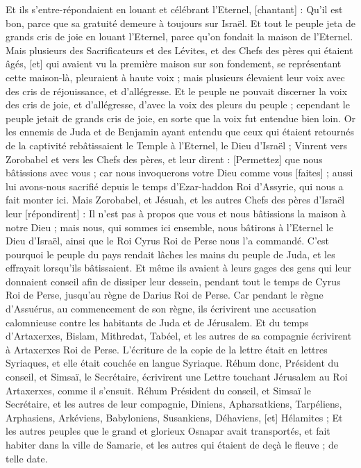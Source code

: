 \begin{multicols}{2}
Et ils s'entre-répondaient en louant et célébrant l'Eternel, [chantant] : Qu'il est bon, parce que sa gratuité demeure à toujours sur Israël. Et tout le peuple jeta de grands cris de joie en louant l'Eternel, parce qu'on fondait la maison de l'Eternel.
Mais plusieurs des Sacrificateurs et des Lévites, et des Chefs des pères qui étaient âgés, [et] qui avaient vu la première maison sur son fondement, se représentant cette maison-là, pleuraient à haute voix ; mais plusieurs élevaient leur voix avec des cris de réjouissance, et d'allégresse.
Et le peuple ne pouvait discerner la voix des cris de joie, et d'allégresse, d'avec la voix des pleurs du peuple ; cependant le peuple jetait de grands cris de joie, en sorte que la voix fut entendue bien loin.
\VerseOne{}Or les ennemis de Juda et de Benjamin ayant entendu que ceux qui étaient retournés de la captivité rebâtissaient le Temple à l'Eternel, le Dieu d'Israël ;
Vinrent vers Zorobabel et vers les Chefs des pères, et leur dirent : [Permettez] que nous bâtissions avec vous ; car nous invoquerons votre Dieu comme vous [faites] ; aussi lui avons-nous sacrifié depuis le temps d'Ezar-haddon Roi d'Assyrie, qui nous a fait monter ici.
Mais Zorobabel, et Jésuah, et les autres Chefs des pères d'Israël leur [répondirent] : Il n'est pas à propos que vous et nous bâtissions la maison à notre Dieu ; mais nous, qui sommes ici ensemble, nous bâtirons à l'Eternel le Dieu d'Israël, ainsi que le Roi Cyrus Roi de Perse nous l'a commandé.
C'est pourquoi le peuple du pays rendait lâches les mains du peuple de Juda, et les effrayait lorsqu'ils bâtissaient.
Et même ils avaient à leurs gages des gens qui leur donnaient conseil afin de dissiper leur dessein, pendant tout le temps de Cyrus Roi de Perse, jusqu'au règne de Darius Roi de Perse.
Car pendant le règne d'Assuérus, au commencement de son règne, ils écrivirent une accusation calomnieuse contre les habitants de Juda et de Jérusalem.
Et du temps d'Artaxerxes, Bislam, Mithredat, Tabéel, et les autres de sa compagnie écrivirent à Artaxerxes Roi de Perse. L'écriture de la copie de la lettre était en lettres Syriaques, et elle était couchée en langue Syriaque.
Réhum donc, Président du conseil, et Simsaï, le Secrétaire, écrivirent une Lettre touchant Jérusalem au Roi Artaxerxes, comme il s'ensuit.
Réhum Président du conseil, et Simsaï le Secrétaire, et les autres de leur compagnie, Diniens, Apharsatkiens, Tarpéliens, Arphasiens, Arkéviens, Babyloniens, Susankiens, Déhaviens, [et] Hélamites ;
Et les autres peuples que le grand et glorieux Osnapar avait transportés, et fait habiter dans la ville de Samarie, et les autres qui étaient de deçà le fleuve ; de telle date.

\end{multicols}
